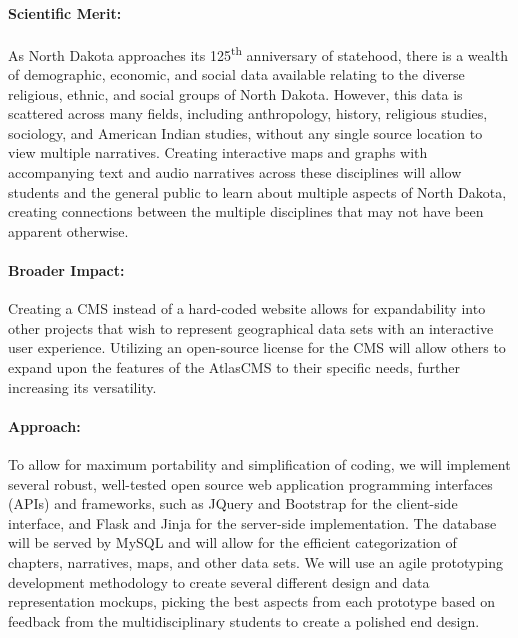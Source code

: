 \documentclass[12pt]{article}
\begin{document}
\paragraph{Scientific Merit:} \hspace{-5mm} As North Dakota approaches its 125\textsuperscript{th} anniversary of statehood, there is a wealth of demographic, economic, and social data available relating to the diverse religious, ethnic, and social groups of North Dakota. However, this data is scattered across many fields, including anthropology, history, religious studies, sociology, and American Indian studies, without any single source location to view multiple narratives. Creating interactive maps and graphs with accompanying text and audio narratives across these disciplines will allow students and the general public to learn about multiple aspects of North Dakota, creating connections between the multiple disciplines that may not have been apparent otherwise.

\paragraph{Broader Impact:} \hspace{-5mm} Creating a CMS instead of a hard-coded website allows for expandability into other projects that wish to represent geographical data sets with an interactive user experience. Utilizing an open-source license for the CMS will allow others to expand upon the features of the AtlasCMS to their specific needs, further increasing its versatility.

\paragraph{Approach:} \hspace{-5mm} To allow for maximum portability and simplification of coding, we will implement several robust, well-tested open source web application programming interfaces (APIs) and frameworks, such as JQuery and Bootstrap for the client-side interface, and Flask and Jinja for the server-side implementation. The database will be served by MySQL and will allow for the efficient categorization of chapters, narratives, maps, and other data sets. We will use an agile prototyping development methodology to create several different design and data representation mockups, picking the best aspects from each prototype based on feedback from the multidisciplinary students to create a polished end design.
\end{document}
